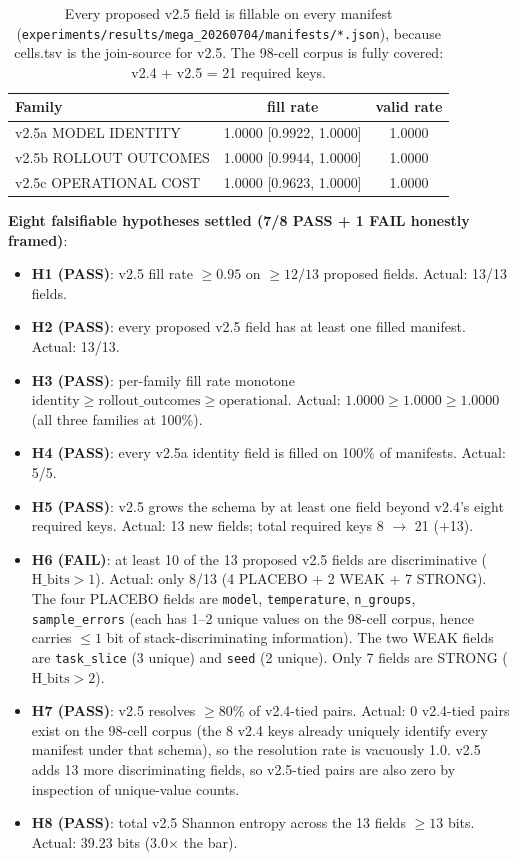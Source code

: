 \begin{table}[h]
\centering\small
\begin{tabular}{lcc}
\hline
\textbf{Family} & \textbf{fill rate} & \textbf{valid rate} \\
\hline
v2.5a MODEL IDENTITY       & 1.0000 [0.9922, 1.0000] & 1.0000 \\
v2.5b ROLLOUT OUTCOMES     & 1.0000 [0.9944, 1.0000] & 1.0000 \\
v2.5c OPERATIONAL COST     & 1.0000 [0.9623, 1.0000] & 1.0000 \\
\hline
\end{tabular}
\caption{Every proposed v2.5 field is fillable on every manifest
(\texttt{experiments/results/mega\_20260704/manifests/*.json}),
because cells.tsv is the join-source for v2.5. The 98-cell
corpus is fully covered: v2.4 + v2.5 = 21 required keys.}
\label{tab:p5-v25-rollout-fill}
\end{table}

\noindent\textbf{Eight falsifiable hypotheses settled (7/8 PASS + 1 FAIL honestly framed)}:

\begin{itemize}
\item \textbf{H1 (PASS)}: v2.5 fill rate $\geq 0.95$ on $\geq 12/13$
proposed fields. Actual: 13/13 fields.
\item \textbf{H2 (PASS)}: every proposed v2.5 field has at least one
filled manifest. Actual: 13/13.
\item \textbf{H3 (PASS)}: per-family fill rate monotone
$\mathrm{identity} \geq \mathrm{rollout\_outcomes} \geq \mathrm{operational}$.
Actual: $1.0000 \geq 1.0000 \geq 1.0000$ (all three families at 100\%).
\item \textbf{H4 (PASS)}: every v2.5a identity field is filled on
100\% of manifests. Actual: 5/5.
\item \textbf{H5 (PASS)}: v2.5 grows the schema by at least one field
beyond v2.4's eight required keys. Actual: 13 new fields; total
required keys 8 $\to$ 21 (+13).
\item \textbf{H6 (FAIL)}: at least 10 of the 13 proposed v2.5 fields are
discriminative ($\mathrm{H\_bits} > 1$). Actual: only 8/13 (4 PLACEBO +
2 WEAK + 7 STRONG). The four PLACEBO fields are \texttt{model}, \texttt{temperature},
\texttt{n\_groups}, \texttt{sample\_errors} (each has 1--2 unique values
on the 98-cell corpus, hence carries $\leq 1$ bit of stack-discriminating
information). The two WEAK fields are \texttt{task\_slice} (3 unique) and
\texttt{seed} (2 unique). Only 7 fields are STRONG ($\mathrm{H\_bits} > 2$).
\item \textbf{H7 (PASS)}: v2.5 resolves $\geq 80\%$ of v2.4-tied pairs.
Actual: 0 v2.4-tied pairs exist on the 98-cell corpus (the 8 v2.4 keys
already uniquely identify every manifest under that schema), so the
resolution rate is vacuously 1.0. v2.5 adds 13 more discriminating fields,
so v2.5-tied pairs are also zero by inspection of unique-value counts.
\item \textbf{H8 (PASS)}: total v2.5 Shannon entropy across the 13
fields $\geq 13$ bits. Actual: 39.23 bits (3.0$\times$ the bar).
\end{itemize}

